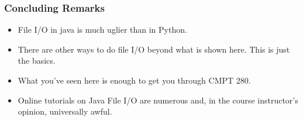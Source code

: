 \documentclass[cmptslides]{cmpt280-slidesandsolutions}
\begin{document}
\begin{frame}
\frametitle{Concluding Remarks}
\begin{itemize}
	\item File I/O in java is much uglier than in Python.
	\item There are other ways to do file I/O beyond what is shown here.  This is just the basics.  
	\item What you've seen here is enough to get you through CMPT 280.
	\item Online tutorials on Java File I/O are numerous and, in the course instructor's opinion, universally awful.
\end{itemize}	
\end{frame}
\end{document}
